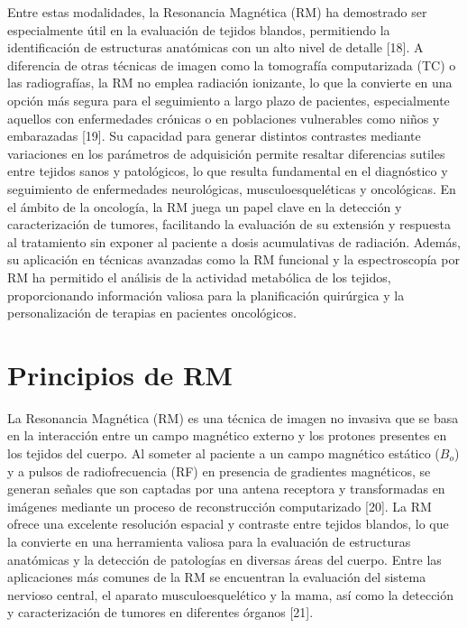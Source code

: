 Entre estas modalidades, la Resonancia Magnética (RM) ha demostrado ser especialmente útil en la evaluación de tejidos blandos, permitiendo la identificación de estructuras anatómicas con un alto nivel de detalle [18]. A diferencia de otras técnicas de imagen como la tomografía computarizada (TC) o las radiografías, la RM no emplea radiación ionizante, lo que la convierte en una opción más segura para el seguimiento a largo plazo de pacientes, especialmente aquellos con enfermedades crónicas o en poblaciones vulnerables como niños y embarazadas [19]. Su capacidad para generar distintos contrastes mediante variaciones en los parámetros de adquisición permite resaltar diferencias sutiles entre tejidos sanos y patológicos, lo que resulta fundamental en el diagnóstico y seguimiento de enfermedades neurológicas, musculoesqueléticas y oncológicas. En el ámbito de la oncología, la RM juega un papel clave en la detección y caracterización de tumores, facilitando la evaluación de su extensión y respuesta al tratamiento sin exponer al paciente a dosis acumulativas de radiación. Además, su aplicación en técnicas avanzadas como la RM funcional y la espectroscopía por RM ha permitido el análisis de la actividad metabólica de los tejidos, proporcionando información valiosa para la planificación quirúrgica y la personalización de terapias en pacientes oncológicos.

\section{Principios de RM} \label{sec:rm}
La Resonancia Magnética (RM) es una técnica de imagen no invasiva que se basa en la interacción entre un campo magnético externo y los protones presentes en los tejidos del cuerpo. Al someter al paciente a un campo magnético estático ($B_o$) y a pulsos de radiofrecuencia (RF) en presencia de gradientes magnéticos, se generan señales que son captadas por una antena receptora y transformadas en imágenes mediante un proceso de reconstrucción computarizado [20]. La RM ofrece una excelente resolución espacial y contraste entre tejidos blandos, lo que la convierte en una herramienta valiosa para la evaluación de estructuras anatómicas y la detección de patologías en diversas áreas del cuerpo. Entre las aplicaciones más comunes de la RM se encuentran la evaluación del sistema nervioso central, el aparato musculoesquelético y la mama, así como la detección y caracterización de tumores en diferentes órganos [21].
\begin{marginfigure}
\label{fig:marginfig2}
\end{marginfigure}

